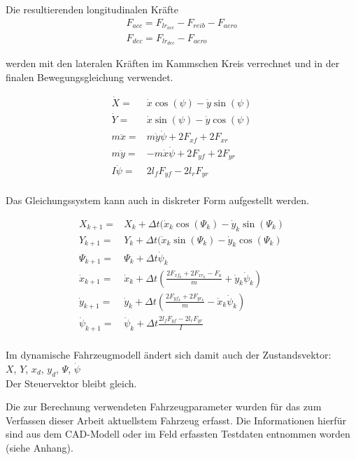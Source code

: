 \documentclass{like}
\begin{document}
Die resultierenden longitudinalen Kräfte 
\begin{eqnarray}
F_{acc} = F_{lr_{acc}} - F_{reib} - F_{aero}\\
F_{dec} = F_{lr_{dec}} - F_{aero}
\end{eqnarray}

werden mit den lateralen Kräften im Kammschen Kreis verrechnet und in der finalen Bewegungsgleichung verwendet.

\begin{eqnarray}
\dot{X} =& \dot{x} \cos(\psi) - \dot{y} \sin(\psi) \\
\dot{Y} =& \dot{x} \sin(\psi) - \dot{y} \cos(\psi) \\
m \ddot{x} =& m \dot{y} \dot{\psi} + 2F_{xf} + 2 F_{xr}\\
m \ddot{y} =& - m \dot{x} \dot{\psi} + 2 F_{yf} + 2 F_{yr} \\
I \ddot{\psi} =& 2 l_f F_{yf} - 2 l_r F_{yr} \\
\end{eqnarray}

Das Gleichungssystem kann auch in diskreter Form aufgestellt werden.

\begin{eqnarray}
X_{k+1} =& X_k + \Delta t(\dot{x}_k \cos(\Psi_k) - \dot{y}_k \sin(\Psi_k) \\
Y_{k+1} =& Y_{k} + \Delta t(\dot{x}_k \sin(\Psi_k) - \dot{y}_k \cos(\Psi_k) \\
\Psi_{k+1} =& \Psi_k + \Delta t \dot{\psi}_k \\
\dot{x}_{k+1} =&  \dot{x}_k + \Delta t (\frac{2F_{xf_k} + 2 F_{xr_k}- F_a}{m} + \dot{y}_k \dot{\psi}_k) \\
\dot{y}_{k+1} =&  \dot{y}_k + \Delta t (\frac{2 F_{yf_k} + 2 F_{yr_k}}{m} - \dot{x}_k \dot{\psi}_k)  \\
\dot{\psi}_{k+1} =& \dot{\psi}_k + \Delta t \frac{2 l_f F_{yf} - 2 l_r F_{yr}}{I} \\
\end{eqnarray}

Im dynamische Fahrzeugmodell ändert sich damit auch der Zustandsvektor: \\
\(X\), \(Y\), \(x_d\), \(y_d\), \(\Psi\), \(\dot{\psi}\) \\
Der Steuervektor bleibt gleich.

Die zur Berechnung verwendeten Fahrzeugparameter wurden für das zum Verfassen dieser Arbeit aktuellstem Fahrzeug erfasst. Die Informationen hierfür sind aus dem CAD-Modell oder im Feld erfassten Testdaten entnommen worden (siehe Anhang).
\end{document}
